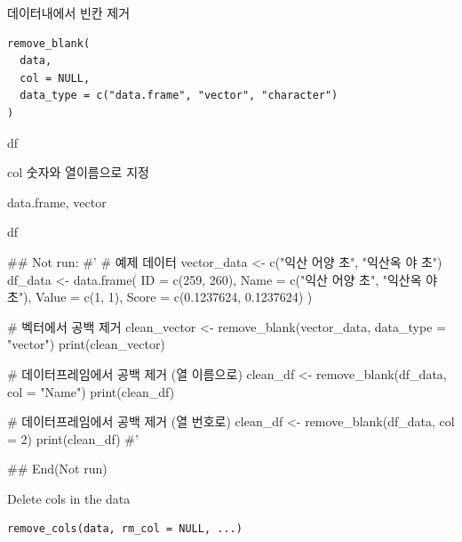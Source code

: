 \documentclass[a4paper]{book}
\begin{document}
%
\begin{Description}
데이터내에서 빈칸 제거
\end{Description}
%
\begin{Usage}
\begin{verbatim}
remove_blank(
  data,
  col = NULL,
  data_type = c("data.frame", "vector", "character")
)
\end{verbatim}
\end{Usage}
%
\begin{Arguments}
\begin{ldescription}
\item[\code{data}] df

\item[\code{col}] col 숫자와 열이름으로 지정

\item[\code{data\_type}] data.frame, vector
\end{ldescription}
\end{Arguments}
%
\begin{Value}
df
\end{Value}
%
\begin{Examples}
\begin{ExampleCode}
\#\# Not run: 
#'
# 예제 데이터
vector_data <- c("익산 어양 초", "익산옥 야 초")
df_data <- data.frame(
  ID = c(259, 260),
  Name = c("익산 어양 초", "익산옥 야 초"),
  Value = c(1, 1),
  Score = c(0.1237624, 0.1237624)
)

# 벡터에서 공백 제거
clean_vector <- remove_blank(vector_data, data_type = "vector")
print(clean_vector)

# 데이터프레임에서 공백 제거 (열 이름으로)
clean_df <- remove_blank(df_data, col = "Name")
print(clean_df)

# 데이터프레임에서 공백 제거 (열 번호로)
clean_df <- remove_blank(df_data, col = 2)
print(clean_df)
#'


## End(Not run)
\end{ExampleCode}
\end{Examples}
%
\begin{Description}
Delete cols in the data
\end{Description}
%
\begin{Usage}
\begin{verbatim}
remove_cols(data, rm_col = NULL, ...)
\end{verbatim}
\end{Usage}
\end{document}
